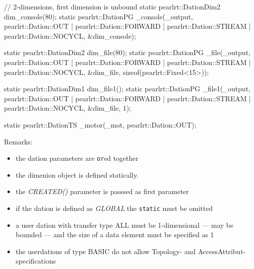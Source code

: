 \begin{CppCode} 
// 2-dimensions, first dimension is unbound
static pearlrt::DationDim2 dim_console(80);
static pearlrt::DationPG _console(_output, 
                pearlrt::Dation::OUT      |
                pearlrt::Dation::FORWARD  | 
                pearlrt::Dation::STREAM   |
                pearlrt::Dation::NOCYCL,
                &dim_console);

static pearlrt::DationDim2 dim_file(80);
static pearlrt::DationPG _file(_output, 
                pearlrt::Dation::OUT      |
                pearlrt::Dation::FORWARD  | 
                pearlrt::Dation::STREAM   |
                pearlrt::Dation::NOCYCL,
                &dim_file, sizeof(pearlrt::Fixed<15>));

static pearlrt::DationDim1 dim_file1();
static pearlrt::DationPG _file1(_output, 
                pearlrt::Dation::OUT      |
                pearlrt::Dation::FORWARD  | 
                pearlrt::Dation::STREAM   |
                pearlrt::Dation::NOCYCL,
                &dim_file, 1);

static pearlrt::DationTS _motor(_mot,
                pearlrt::Dation::OUT);
\end{CppCode}

Remarks:
\begin{itemize}
\item the dation parameters are \verb|or|ed together
\item the dimenion object is defined statically.
\item the {\em CREATED()} parameter is passsed as first parameter
\item if the dation is defined as {\em GLOBAL} the \verb|static| must
  be omitted
\item a user dation with transfer type ALL must be 1-dimensional --- may
be bounded --- and the size of a data element must be specified as 1
\item the userdations of type BASIC do not allow Topology- and 
AccessAttribut-specifications 
\end{itemize}

